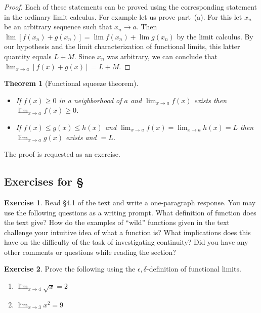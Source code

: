 \documentclass[11pt,oneside]{amsbook}
\theoremstyle{definition}
\newtheorem{exerc}{Exercise}[section]
\theoremstyle{plain}
\newtheorem{thm}{Theorem}[section]
\theoremstyle{definition}
\theoremstyle{remark}
\numberwithin{equation}{section}
\numberwithin{figure}{section}
\begin{document}
\begin{proof}
  Each of these statements can be proved using the corresponding statement in the ordinary limit calculus. For example let us prove part~(a). For this let $x_n$ be an arbitrary sequence such that $x_n\to a$. Then $\lim[f(x_n)+g(x_n)]=\lim f(x_n)+\lim g(x_n)$ by the limit calculus. By our hypothesis and the limit characterization of functional limits, this latter quantity equals $L+M$. Since $x_n$ was arbitrary, we can conclude that $\lim_{x\to a}[f(x)+g(x)]=L+M$.
\end{proof}

\begin{thm}[Functional squeeze theorem]\
  \begin{itemize}
  \item If $f(x)\geq0$ in a neighborhood of $a$ and $\lim_{x\to a}f(x)$ exists then $\lim_{x\to a}f(x)\geq0$.
  \item If $f(x)\leq g(x)\leq h(x)$ and $\lim_{x\to a}f(x)=\lim_{x\to a}h(x)=L$ then $\lim_{x\to a}g(x)$ exists and $=L$.
  \end{itemize}
\end{thm}

The proof is requested as an exercise.

\newpage
\subsection*{Exercises for \S \thesection}

\begin{exerc}
  Read \S4.1 of the text and write a one-paragraph response. You may use the following questions as a writing prompt. What definition of function does the text give? How do the examples of ``wild'' functions given in the text challenge your intuitive idea of what a function is? What implications does this have on the difficulty of the task of investigating continuity? Did you have any other comments or questions while reading the section?
\end{exerc}

\begin{exerc}
  Prove the following using the $\epsilon,\delta$-definition of functional limits.
  \begin{enumerate}
    \item $\lim_{x\to4}\sqrt{x}=2$
    \item $\lim_{x\to3}x^2=9$
  \end{enumerate}
\end{exerc}
\end{document}
